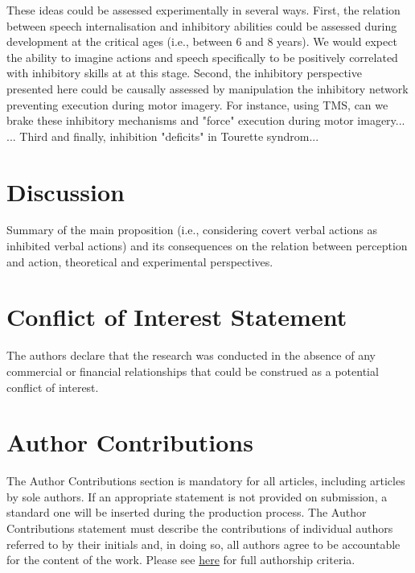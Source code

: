 \documentclass[utf8]{template/frontiersSCNS} %
\begin{document}
These ideas could be assessed experimentally in several ways. First, the relation between speech internalisation and inhibitory abilities could be assessed during development at the critical ages (i.e., between 6 and 8 years). We would expect the ability to imagine actions and speech specifically to be positively correlated with inhibitory skills at at this stage. Second, the inhibitory perspective presented here could be causally assessed by manipulation the inhibitory network preventing execution during motor imagery. For instance, using TMS, can we brake these inhibitory mechanisms and "force" execution during motor imagery... \citep{angelini_motor_2015, angelini_proactive_2016}... Third and finally, inhibition "deficits" in Tourette syndrom...

\section{Discussion}

Summary of the main proposition (i.e., considering covert verbal actions as inhibited verbal actions) and its consequences on the relation between perception and action, theoretical and experimental perspectives.

\section*{Conflict of Interest Statement}


The authors declare that the research was conducted in the absence of any commercial or financial relationships that could be construed as a potential conflict of interest.

\section*{Author Contributions}

The Author Contributions section is mandatory for all articles, including articles by sole authors. If an appropriate statement is not provided on submission, a standard one will be inserted during the production process. The Author Contributions statement must describe the contributions of individual authors referred to by their initials and, in doing so, all authors agree to be accountable for the content of the work. Please see  \href{http://home.frontiersin.org/about/author-guidelines#AuthorandContributors}{here} for full authorship criteria.
\end{document}
